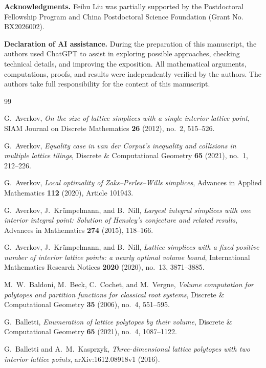 \documentclass[reqno, 11pt]{article}
\numberwithin{equation}{section}
\theoremstyle{definition}
\begin{document}
\vspace{5mm}
\noindent
\textbf{Acknowledgments.}
Feihu Liu was partially supported by the Postdoctoral Fellowship Program and China Postdoctoral Science Foundation (Grant No. BX2026002).

\noindent\textbf{Declaration of AI assistance.}
During the preparation of this manuscript, the authors used ChatGPT to assist in exploring possible approaches, checking technical details, and improving the exposition. All mathematical arguments, computations, proofs, and results were independently verified by the authors. The authors take full responsibility for the content of this manuscript.


\begin{thebibliography}{99}

 G.~Averkov, \emph{On the size of lattice simplices with a single interior lattice point}, SIAM Journal on Discrete Mathematics \textbf{26} (2012), no.~2, 515--526.

 G.~Averkov, \emph{Equality case in van der Corput's inequality and collisions in multiple lattice tilings}, Discrete \& Computational Geometry \textbf{65} (2021), no.~1, 212--226.

 G.~Averkov, \emph{Local optimality of Zaks--Perles--Wills simplices}, Advances in Applied Mathematics \textbf{112} (2020), Article 101943.

 G.~Averkov, J.~Kr\"umpelmann, and B.~Nill, \emph{Largest integral simplices with one interior integral point: Solution of Hensley's conjecture and related results}, Advances in Mathematics \textbf{274} (2015), 118--166.

 G.~Averkov, J.~Kr\"umpelmann, and B.~Nill, \emph{Lattice simplices with a fixed positive number of interior lattice points: a nearly optimal volume bound}, International Mathematics Research Notices \textbf{2020} (2020), no.~13, 3871--3885.

 M.~W.~Baldoni, M.~Beck, C.~Cochet, and M.~Vergne, \emph{Volume computation for polytopes and partition functions for classical root systems}, Discrete \& Computational Geometry \textbf{35} (2006), no.~4, 551--595.

 G.~Balletti, \emph{Enumeration of lattice polytopes by their volume}, Discrete \& Computational Geometry \textbf{65} (2021), no.~4, 1087--1122.

 G.~Balletti and A.~M.~Kasprzyk, \emph{Three-dimensional lattice polytopes with two interior lattice points}, arXiv:1612.08918v1 (2016).


\end{thebibliography}
\end{document}
